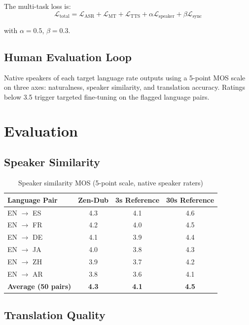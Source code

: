 \documentclass[11pt,a4paper]{article}
\begin{document}
The multi-task loss is:
\begin{equation}
\mathcal{L}_{\text{total}} = \mathcal{L}_{\text{ASR}} + \mathcal{L}_{\text{MT}} + \mathcal{L}_{\text{TTS}} + \alpha \mathcal{L}_{\text{speaker}} + \beta \mathcal{L}_{\text{sync}}
\end{equation}

with $\alpha = 0.5$, $\beta = 0.3$.

\subsection{Human Evaluation Loop}

Native speakers of each target language rate outputs using a 5-point MOS scale
on three axes: naturalness, speaker similarity, and translation accuracy. Ratings
below 3.5 trigger targeted fine-tuning on the flagged language pairs.

\section{Evaluation}
\label{sec:eval}

\subsection{Speaker Similarity}

\begin{table}[H]
\centering
\caption{Speaker similarity MOS (5-point scale, native speaker raters)}
\begin{tabular}{lccc}
\toprule
\textbf{Language Pair} & \textbf{Zen-Dub} & \textbf{3s Reference} & \textbf{30s Reference} \\
\midrule
EN $\to$ ES  & 4.3 & 4.1 & 4.6 \\
EN $\to$ FR  & 4.2 & 4.0 & 4.5 \\
EN $\to$ DE  & 4.1 & 3.9 & 4.4 \\
EN $\to$ JA  & 4.0 & 3.8 & 4.3 \\
EN $\to$ ZH  & 3.9 & 3.7 & 4.2 \\
EN $\to$ AR  & 3.8 & 3.6 & 4.1 \\
\textbf{Average (50 pairs)} & \textbf{4.3} & \textbf{4.1} & \textbf{4.5} \\
\bottomrule
\end{tabular}
\label{tab:mos}
\end{table}

\subsection{Translation Quality}
\end{document}
